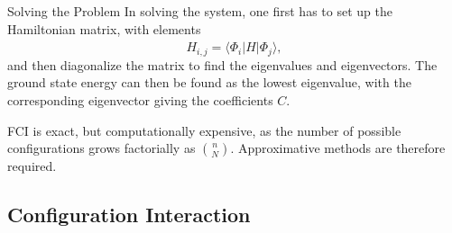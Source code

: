 \documentclass[UKenglish,aspectratio=169]{beamer}
\begin{document}
\begin{frame}{Solving the Problem}
    In solving the system, one first has to set up the Hamiltonian
    matrix, with elements
    \begin{equation}
        H_{i, j} = \langle \Phi_i \lvert \hat{H} \rvert \Phi_j \rangle,
    \end{equation}
    and then diagonalize the matrix to find the eigenvalues and eigenvectors.
    The ground state energy can then be found as the lowest
    eigenvalue, with the corresponding eigenvector giving the coefficients $C$.

    \bigskip

    FCI is exact, but computationally expensive, as the number of possible configurations grows factorially as $\binom{n}{N}$.
    Approximative methods are therefore required.
\end{frame}

\subsection{Configuration Interaction}
\end{document}
